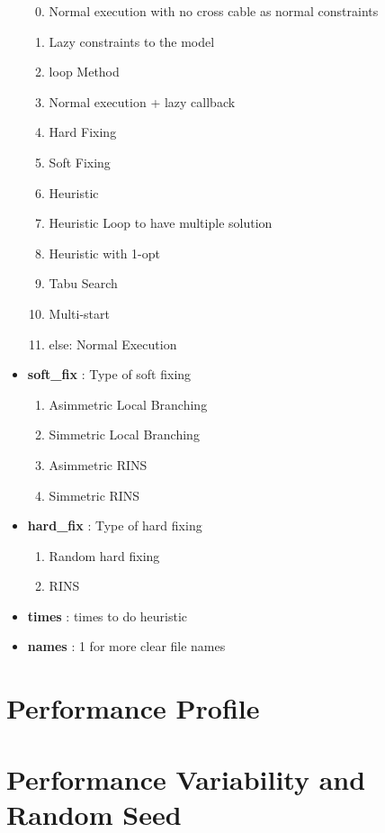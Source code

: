 \begin{appendices}
\begin{itemize}
\begin{enumerate}\setcounter{enumi}{-1}
\setlength{\parskip}{0pt}
\setlength{\itemsep}{0pt plus 1pt}
	\item Normal execution with no cross cable as normal constraints
	\item Lazy constraints to the model
	\item loop Method
	\item Normal execution + lazy callback
	\item Hard Fixing
	\item Soft Fixing
	\item Heuristic
	\item Heuristic Loop to have multiple solution
	\item Heuristic with 1-opt
	\item Tabu Search
	\item Multi-start
	\item[] else: Normal Execution
\end{enumerate}
\item \textbf{soft\_fix} : Type of soft fixing
\begin{enumerate}\setcounter{enumi}{0}
\setlength{\parskip}{0pt}
\setlength{\itemsep}{0pt plus 1pt}
	\item Asimmetric Local Branching
	\item Simmetric Local Branching
	\item Asimmetric RINS
	\item Simmetric RINS
\end{enumerate}
\item \textbf{hard\_fix} : Type of hard fixing
\begin{enumerate}\setcounter{enumi}{0}
\setlength{\parskip}{0pt}
\setlength{\itemsep}{0pt plus 1pt}
	\item Random hard fixing
	\item RINS
\end{enumerate}
\item \textbf{times} : times to do heuristic
\item \textbf{names} : 1 for more clear file names
\end{itemize}

\chapter{Performance Profile}

\chapter{Performance Variability and Random Seed}
















\end{appendices}



